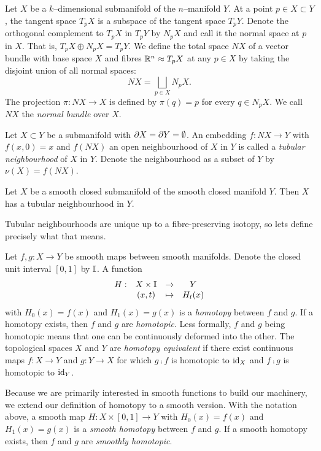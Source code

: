 \begin{defn}
	Let $X$ be a $k$--dimensional submanifold of the $n$--manifold $Y$.
	At a point $p\in X\subset Y$, the tangent space $T_p X$ is a subspace of the tangent space $T_p Y$.
	Denote the orthogonal complement to $T_p X$ in $T_p Y$ by $N_p X$ and call it the normal space at $p$ in $X$.
	That is, $T_p X\oplus N_p X = T_p Y$.
	We define the total space $NX$ of a vector bundle with base space $X$ and fibres $\mathbb{R}^n\approx T_p X$ at any $p\in X$ by taking the disjoint union of all normal spaces:
	\[
		NX = \bigsqcup_{p\in X} N_p X.
	\]
	The projection $\pi:NX\to X$ is defined by $\pi(q)=p$ for every $q\in N_p X$.
	We call $NX$ the \emph{normal bundle} over $X$.	
\end{defn}

\begin{defn}
	\label{def:tubularneighbourhood}
	Let $X\subset Y$ be a submanifold with $\partial X = \partial Y = \emptyset$.
	An embedding $f:NX\to Y$ with $f(x,0)=x$ and $f(NX)$ an open neighbourhood of $X$ in $Y$ is called a \emph{tubular neighbourhood} of $X$ in $Y$.
	Denote the neighbourhood as a subset of $Y$ by $\nu(X)=f(NX)$.
\end{defn}

\begin{theorem}
	\label{thm:tubularneighbourhood}
	Let $X$ be a smooth closed submanifold of the smooth closed manifold $Y$.
	Then $X$ has a tubular neighbourhood in $Y$.
\end{theorem}

Tubular neighbourhoods are unique up to a fibre-preserving isotopy, so lets define precisely what that means.

\begin{defn}[Homotopy]
	\label{def:homotopy}
	Let $f,g:X\to Y$ be smooth maps between smooth manifolds.
	Denote the closed unit interval $[0,1]$ by $\mathbb{I}$.
	A function 
	\[
		\begin{array}{cccc}
			H: & X\times \mathbb{I} & \to & Y \\
			   & (x,t)	& \mapsto & H_t(x)
		\end{array}
	\]
	with $H_0(x)=f(x)$ and $H_1(x)=g(x)$ is a \emph{homotopy} between $f$ and $g$.
	If a homotopy exists, then $f$ and $g$ are \emph{homotopic}.
	Less formally, $f$ and $g$ being homotopic means that one can be continuously deformed into the other.
	The topological spaces $X$ and $Y$ are \emph{homotopy equivalent} if there exist continuous maps $f:X\to Y$ and $g:Y\to X$ for which $g\comp f$ is homotopic to $\textrm{id}_{X}$ and $f\comp g$ is homotopic to $\textrm{id}_{Y}$.
	
	Because we are primarily interested in smooth functions to build our machinery, we extend our definition of homotopy to a smooth version.
	With the notation above, a smooth map $H:X\times[0,1]\to Y$ with $H_0(x)=f(x)$ and $H_1(x)=g(x)$ is a \emph{smooth homotopy} between $f$ and $g$.
	If a smooth homotopy exists, then $f$ and $g$ are \emph{smoothly homotopic}.
\end{defn}

